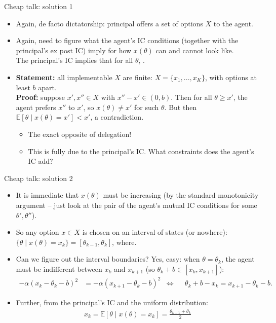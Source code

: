 \documentclass[english,10pt
,aspectratio=169
]{beamer}
\begin{document}
\begin{frame}{Cheap talk: solution 1}
	\begin{itemize}
		\item Again, de facto dictatorship: principal offers a \alert{set of options $X$} to the agent.
		
		\item Again, need to figure what the agent's IC conditions (together with the principal's ex post IC) imply for how $x(\theta)$ can and cannot look like. \\
		The principal's IC implies that for all $\theta$, .
		
		\pause 
		
		\item \textbf{Statement:} all implementable $X$ are finite: $X = \{x_1,...,x_K\}$, with options at least $b$ apart.\\
		\textbf{Proof:} suppose $x',x'' \in X$ with $x''-x' \in (0,b)$. Then for all $\theta \geq x'$, the agent prefers $x''$ to $x'$, so $x(\theta) \neq x'$ for such $\theta$. But then $\mathbb{E}[\theta \mid x(\theta) = x'] < x'$, a contradiction.
		\pause 
		\begin{itemize}
			\item The exact opposite of delegation!
			\item This is fully due to the principal's IC. What constraints does the agent's IC add?
		\end{itemize}
	\end{itemize}
\end{frame}


\begin{frame}{Cheap talk: solution 2}
	\begin{itemize}
		\item It is immediate that $x(\theta)$ must be increasing (by the standard monotonicity argument -- just look at the pair of the agent's mutual IC conditions for some $\theta',\theta''$).
		
		\item So any option $x \in X$ is chosen on an interval of states (or nowhere): $\{ \theta \mid x(\theta)=x_k \} = [\theta_{k-1}, \theta_k]$, where. 

		\item Can we figure out the interval boundaries? Yes, easy: when $\theta=\theta_k$, the agent must be indifferent between $x_k$ and $x_{k+1}$ (so $\theta_k+b \in [x_k, x_{k+1}]$):
		\begin{align*}
			- \alpha (x_k-\theta_k-b)^2 &= - \alpha (x_{k+1}-\theta_k-b)^2
			& \iff & &
			\theta_k+b - x_k = x_{k+1} - \theta_k - b.
		\end{align*}
		
		\item Further, from the principal's IC and the uniform distribution:
		\begin{align*}
			x_k=\mathbb{E}[\theta \mid x(\theta)=x_k ]= \frac{\theta_{k-1} + \theta_k}{2}
		\end{align*}
	\end{itemize}
\end{frame}
\end{document}
